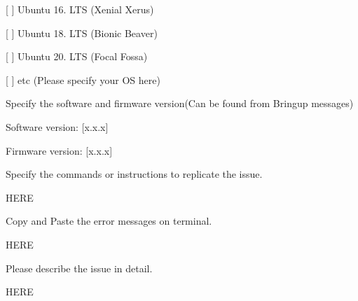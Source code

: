 \begin{DoxyEnumerate}
\begin{DoxyItemize}
\item \mbox{[} \mbox{]} Ubuntu 16. L\+TS (Xenial Xerus)
\item \mbox{[} \mbox{]} Ubuntu 18. L\+TS (Bionic Beaver)
\item \mbox{[} \mbox{]} Ubuntu 20. L\+TS (Focal Fossa)
\item \mbox{[} \mbox{]} etc (Please specify your OS here)
\end{DoxyItemize}
\item Specify the software and firmware version(\+Can be found from Bringup messages)
\begin{DoxyItemize}
\item Software version\+: \mbox{[}x.\+x.\+x\mbox{]}
\item Firmware version\+: \mbox{[}x.\+x.\+x\mbox{]}
\end{DoxyItemize}
\item Specify the commands or instructions to replicate the issue.
\begin{DoxyItemize}
\item H\+E\+RE
\end{DoxyItemize}
\item Copy and Paste the error messages on terminal.
\begin{DoxyItemize}
\item H\+E\+RE
\end{DoxyItemize}
\item Please describe the issue in detail.
\begin{DoxyItemize}
\item H\+E\+RE 
\end{DoxyItemize}
\end{DoxyEnumerate}